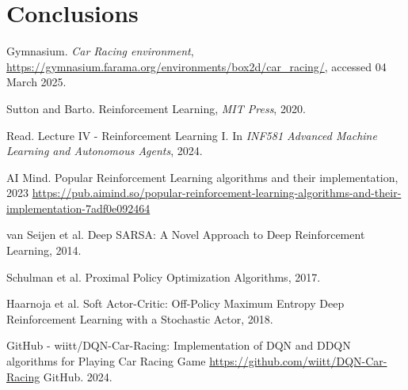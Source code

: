 \documentclass[../CSC_52081_EP.tex]{subfiles}
\begin{document}
    \section{Conclusions}

    \begin{thebibliography}{4}
            Gymnasium. \textit{Car Racing environment}, \url{https://gymnasium.farama.org/environments/box2d/car_racing/}, accessed 04 March 2025.

        Sutton and Barto. Reinforcement Learning,
        {\em MIT Press}, 2020.

            Read. Lecture IV - Reinforcement Learning I. In \textit{INF581 Advanced Machine Learning and Autonomous Agents}, 2024.

            AI Mind. Popular Reinforcement Learning algorithms and their implementation, 2023 \url{https://pub.aimind.so/popular-reinforcement-learning-algorithms-and-their-implementation-7adf0e092464}
        
            van Seijen et al. Deep SARSA: A Novel Approach to Deep Reinforcement Learning, 2014.
        
            Schulman et al. Proximal Policy Optimization Algorithms, 2017.

            Haarnoja et al. Soft Actor-Critic: Off-Policy Maximum Entropy Deep Reinforcement Learning with a Stochastic Actor, 2018.

            GitHub - wiitt/DQN-Car-Racing: Implementation of DQN and DDQN algorithms for Playing Car Racing Game \url{https://github.com/wiitt/DQN-Car-Racing} GitHub. 2024.
         

        \end{thebibliography}
\end{document}
